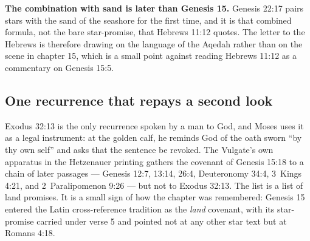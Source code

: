 \textbf{The combination with sand is later than Genesis 15.} Genesis 22:17 pairs
stars with the sand of the seashore for the first time, and it is that combined
formula, not the bare star-promise, that Hebrews 11:12 quotes. The letter to the
Hebrews is therefore drawing on the language of the Aqedah rather than on the
scene in chapter 15, which is a small point against reading Hebrews 11:12 as a
commentary on Genesis 15:5.

\subsection{One recurrence that repays a second look}

Exodus 32:13 is the only recurrence spoken by a man to God, and Moses uses it as
a legal instrument: at the golden calf, he reminds God of the oath sworn ``by
thy own self'' and asks that the sentence be revoked. The Vulgate's own apparatus
in the Hetzenauer printing gathers the covenant of Genesis 15:18 to a chain of
later passages --- Genesis 12:7, 13:14, 26:4, Deuteronomy 34:4, 3~Kings 4:21, and
2~Paralipomenon 9:26 --- but not to Exodus 32:13. The list is a list of land promises. It is a small
sign of how the chapter was remembered: Genesis 15 entered the Latin
cross-reference tradition as the \emph{land} covenant, with its star-promise
carried under verse 5 and pointed not at any other star text but at Romans 4:18.
